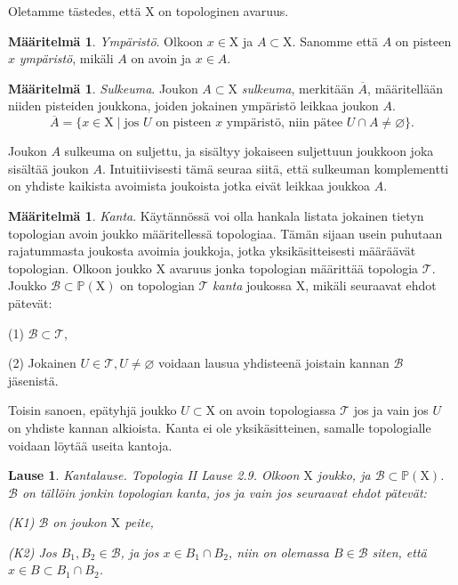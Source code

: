 \documentclass[12pt,a4paper,leqno]{report}
\newcommand{\X}{\mathrm{X}}
\newcommand{\Pow}{\mathbb{P}}
\newcommand{\B}{\mathcal{B}}
\newcommand{\T}{\mathcal{T}}
\theoremstyle{plain}
\newtheorem{lause}[equation]{Lause}
\theoremstyle{definition}
\newtheorem{maar}[equation]{Määritelmä}
\theoremstyle{remark}
\begin{document}
Oletamme tästedes, että $\X$ on topologinen avaruus.

\begin{maar}\label{ymp}
\emph{Ympäristö}. Olkoon $x \in \X$ ja $A \subset \X$. Sanomme että $A$ on pisteen $x$ \emph{ympäristö}, mikäli $A$ on avoin ja $x \in A$.
\end{maar}

\begin{maar}\label{sulk}
\emph{Sulkeuma}. Joukon $A \subset \X$ \emph{sulkeuma}, merkitään $\overline{A}$, määritellään niiden pisteiden joukkona, joiden jokainen ympäristö leikkaa joukon $A$.
\begin{equation}
\overline{A} = \{ x \in \X \mid \text{jos } U \text{ on pisteen } x \text{ ympäristö, niin pätee } U \cap A \not= \varnothing \}\text{.}
\end{equation}
\end{maar}

Joukon $A$ sulkeuma on suljettu, ja sisältyy jokaiseen suljettuun joukkoon joka sisältää joukon $A$. Intuitiivisesti tämä seuraa siitä, että sulkeuman komplementti on yhdiste kaikista avoimista joukoista jotka eivät leikkaa joukkoa $A$.

\begin{maar}\label{kantamaar}
\emph{Kanta}. Käytännössä voi olla hankala listata jokainen tietyn topologian avoin joukko määritellessä topologiaa. Tämän sijaan usein puhutaan rajatummasta joukosta avoimia joukkoja, jotka yksikäsitteisesti määräävät topologian. Olkoon joukko $\X$ avaruus jonka topologian määrittää topologia $\T$. Joukko $\B \subset \Pow(\X)$ on topologian $\T$ \emph{kanta} joukossa $\X$, mikäli seuraavat ehdot pätevät:

(1) $\B \subset \T$,

(2) Jokainen $U \in \T, U \not= \varnothing$ voidaan lausua yhdisteenä joistain kannan $\B$ jäsenistä.
\end{maar}

Toisin sanoen, epätyhjä joukko $U \subset \X$ on avoin topologiassa $\T$ jos ja vain jos $U$ on yhdiste kannan alkioista. Kanta ei ole yksikäsitteinen, samalle topologialle voidaan löytää useita kantoja.

\begin{lause}\label{kantalause}
\emph{Kantalause}. Topologia II \cite{Topo} Lause 2.9. Olkoon $\X$ joukko, ja $\B \subset \Pow(\X)$. $\B$ on tällöin jonkin topologian kanta, jos ja vain jos seuraavat ehdot pätevät:

(K1) $\B$ on joukon $\X$ peite,

(K2) Jos $B_1, B_2 \in \B$, ja jos $x \in B_1 \cap B_2$, niin on olemassa $B \in \B$ siten, että $x \in B \subset B_1 \cap B_2$.
\end{lause}
\end{document}

